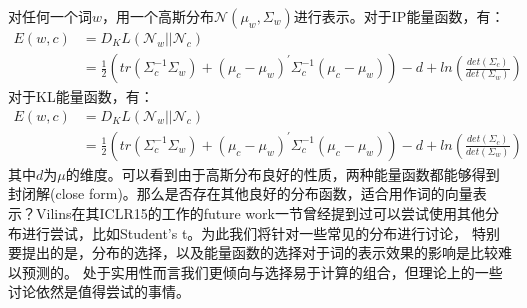 \documentclass[13pt]{article}
\begin{document}
对任何一个词$w$，用一个高斯分布$\mathcal{N}(\mu_w,\Sigma_w)$进行表示。对于IP能量函数，有：
\begin{align*}
E(w,c)&=D_KL(\mathcal{N}_w||\mathcal{N}_c)\\
&=\frac{1}{2}(tr(\Sigma_c^{-1}\Sigma_w)+(\mu_c-\mu_w)^{\prime{}}\Sigma_c^{-1}(\mu_c-\mu_w))-d+ln(\frac{det(\Sigma_c)}{det(\Sigma_w)})
\end{align*}
对于KL能量函数，有：
\begin{align*}
E(w,c)&=D_KL(\mathcal{N}_w||\mathcal{N}_c)\\
&=\frac{1}{2}(tr(\Sigma_c^{-1}\Sigma_w)+(\mu_c-\mu_w)^{\prime{}}\Sigma_c^{-1}(\mu_c-\mu_w))-d+ln(\frac{det(\Sigma_c)}{det(\Sigma_w)})
\end{align*}
其中$d$为$\mu$的维度。可以看到由于高斯分布良好的性质，两种能量函数都能够得到封闭解(close form)。那么是否存在其他良好的分布函数，适合用作词的向量表示？Vilins在其ICLR15的工作的future work一节曾经提到过可以尝试使用其他分布进行尝试，比如Student’s t。为此我们将针对一些常见的分布进行讨论，
特别要提出的是，分布的选择，以及能量函数的选择对于词的表示效果的影响是比较难以预测的。
处于实用性而言我们更倾向与选择易于计算的组合，但理论上的一些讨论依然是值得尝试的事情。
\end{document}
